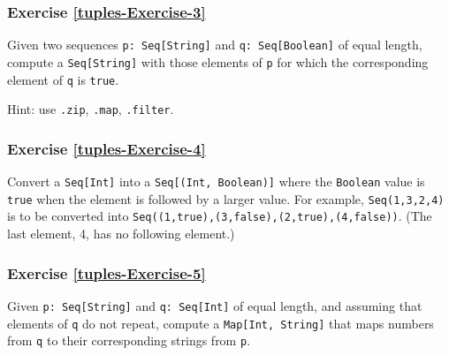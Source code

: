 \subsubsection{Exercise \label{tuples-Exercise-3}\ref{tuples-Exercise-3}}

Given two sequences \lstinline!p: Seq[String]!
and \lstinline!q: Seq[Boolean]!
of equal length, compute a \lstinline!Seq[String]!
with those elements of \lstinline!p!
for which the corresponding element of \lstinline!q!
is \lstinline!true!.

Hint: use \lstinline!.zip!,
\lstinline!.map!, \lstinline!.filter!.

\subsubsection{Exercise \label{tuples-Exercise-4}\ref{tuples-Exercise-4}}

Convert a \lstinline!Seq[Int]!
into a \lstinline!Seq[(Int, Boolean)]!
where the \lstinline!Boolean!
value is \lstinline!true!
when the element is followed by a larger value. For example, \lstinline!Seq(1,3,2,4)!
is to be converted into \lstinline!Seq((1,true),(3,false),(2,true),(4,false))!.
(The last element, 4, has no following element.)

\subsubsection{Exercise \label{tuples-Exercise-5}\ref{tuples-Exercise-5}}

Given \lstinline!p: Seq[String]!
and \lstinline!q: Seq[Int]!
of equal length, and assuming that elements of \lstinline!q!
do not repeat, compute a \lstinline!Map[Int, String]!
that maps numbers from \lstinline!q!
to their corresponding strings from \lstinline!p!.

